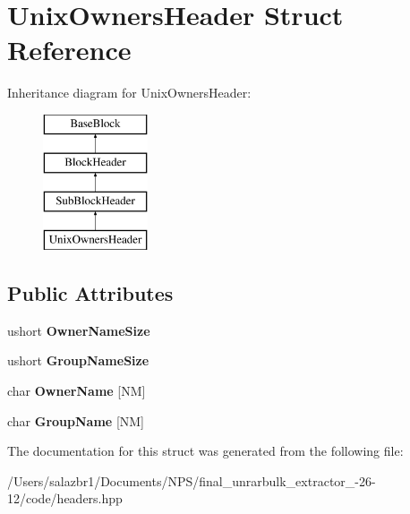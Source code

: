\hypertarget{struct_unix_owners_header}{\section{Unix\-Owners\-Header Struct Reference}
\label{struct_unix_owners_header}
}
Inheritance diagram for Unix\-Owners\-Header\-:\begin{figure}[H]
\begin{center}
\leavevmode
\includegraphics[height=4.000000cm]{struct_unix_owners_header}
\end{center}
\end{figure}
\subsection*{Public Attributes}
\begin{DoxyCompactItemize}
\item 
\hypertarget{struct_unix_owners_header_a7a873745d81d6fca11eb96a6089c22fa}{ushort {\bfseries Owner\-Name\-Size}}\label{struct_unix_owners_header_a7a873745d81d6fca11eb96a6089c22fa}

\item 
\hypertarget{struct_unix_owners_header_a2181313771b87e5f594a5b5d97b6ee53}{ushort {\bfseries Group\-Name\-Size}}\label{struct_unix_owners_header_a2181313771b87e5f594a5b5d97b6ee53}

\item 
\hypertarget{struct_unix_owners_header_a069ae6faf222464bcff8b10417e2aa39}{char {\bfseries Owner\-Name} \mbox{[}N\-M\mbox{]}}\label{struct_unix_owners_header_a069ae6faf222464bcff8b10417e2aa39}

\item 
\hypertarget{struct_unix_owners_header_a7561551724fdf362c444b24aab4a327d}{char {\bfseries Group\-Name} \mbox{[}N\-M\mbox{]}}\label{struct_unix_owners_header_a7561551724fdf362c444b24aab4a327d}

\end{DoxyCompactItemize}


The documentation for this struct was generated from the following file\-:\begin{DoxyCompactItemize}
\item 
/\-Users/salazbr1/\-Documents/\-N\-P\-S/final\-\_\-unrarbulk\-\_\-extractor\-\_-\/26-\/12/code/headers.\-hpp\end{DoxyCompactItemize}
